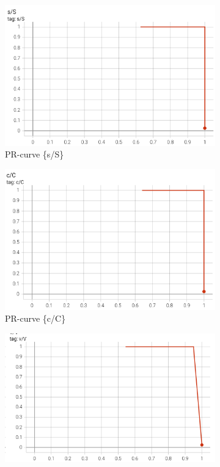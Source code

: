 \begin{figure}[htbp]
    \centering
    \begin{subfigure}[t]{0.32\textwidth}
        \centering
        \includegraphics[width=\textwidth]{images/pr_ignore1.png}
        \caption{PR-curve \{s/S\}}
    \end{subfigure}
    \begin{subfigure}[t]{0.32\textwidth}
        \centering
        \includegraphics[width=\textwidth]{images/pr_ignore2.png}
        \caption{PR-curve \{c/C\}}
    \end{subfigure}
    \begin{subfigure}[t]{0.32\textwidth}
        \centering
        \includegraphics[width=\textwidth]{images/pr_ignore3.png}

\end{subfigure}
\end{figure}
